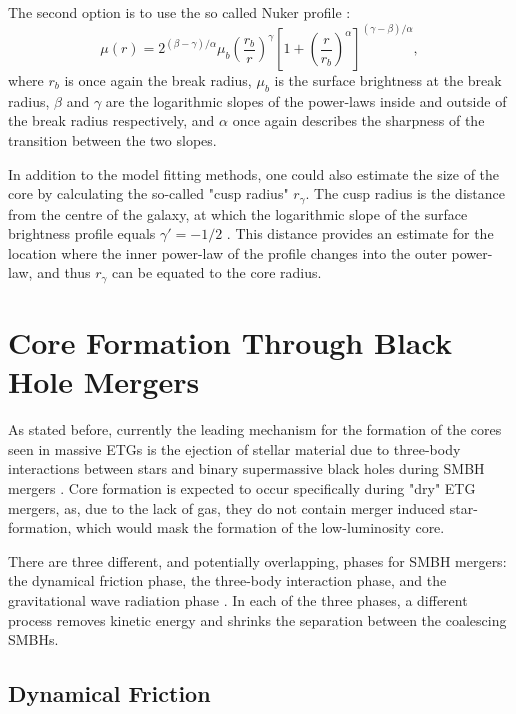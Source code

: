 \documentclass[english, twoside]{HYgradu}
\begin{document}
The second option is to use the so called Nuker profile \citep{Lauer1995}:
\begin{equation}
\mu(r) = 2^{(\beta - \gamma) / \alpha} \mu_b \left( \frac{r_b}{r} \right)^\gamma \left[ 1 + \left( \frac{r}{r_b} \right)^\alpha \right]^{(\gamma - \beta)/\alpha},
\label{eq:nuker}
\end{equation}
where $r_b$ is once again the break radius, $\mu_b$ is the surface brightness at the break radius, $\beta$ and $\gamma$ are the logarithmic slopes of the power-laws inside and outside of the break radius respectively, and $\alpha$ once again describes the sharpness of the transition between the two slopes.

In addition to the model fitting methods, one could also estimate the size of the core by calculating the so-called "cusp radius" $r_\gamma$. The cusp radius is the distance from the centre of the galaxy, at which the logarithmic slope of the surface brightness profile equals $\gamma' = -1/2$ \citep{Carollo1997, Lauer2007Cusp}. This distance provides an estimate for the location where the inner power-law of the profile changes into the outer power-law, and thus $r_\gamma$ can be equated to the core radius. 

\section{Core Formation Through Black Hole Mergers}

As stated before, currently the leading mechanism for the formation of the cores seen in massive ETGs is the ejection of stellar material due to three-body interactions between stars and binary supermassive black holes during SMBH mergers \citep[e.g.][]{Faber1997, Milosavljevic2002, GalaxyFormationAndEvo2010}. Core formation is expected to occur specifically during "dry" ETG mergers, as, due to the lack of gas, they do not contain merger induced star-formation, which would mask the formation of the low-luminosity core.

There are three different, and potentially overlapping, phases for SMBH mergers: the dynamical friction phase, the three-body interaction phase, and the gravitational wave radiation phase \citep{MerrittBook}. In each of the three phases, a different process removes kinetic energy and shrinks the separation between the coalescing SMBHs.

\subsection{Dynamical Friction}
\end{document}
